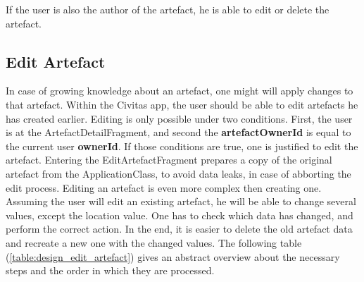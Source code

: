 If the user is also the author of the artefact, he is able to edit or delete the artefact.

\subsection{Edit Artefact}
In case of growing knowledge about an artefact, one might will apply changes to that artefact. Within the Civitas app, the user should be able to edit artefacts he has created earlier. Editing is only possible under two conditions. First, the user is at the ArtefactDetailFragment, and second the \textbf{artefactOwnerId} is equal to the current user \textbf{ownerId}\label{subsection:design_delete_artefact}. If those conditions are true, one is justified to edit the artefact. Entering the EditArtefactFragment prepares a copy of the original artefact from the ApplicationClass, to avoid data leaks, in case of abborting the edit process. 
Editing an artefact is even more complex then creating one. Assuming the user will edit an existing artefact, he will be able to change several values, except the location value. 
One has to check which data has changed, and perform the correct action. In the end, it is easier to delete the old artefact data and recreate a new one with the changed values. 
The following table (\ref{table:design_edit_artefact}) gives an abstract overview about the necessary steps and the order in which they are processed.

